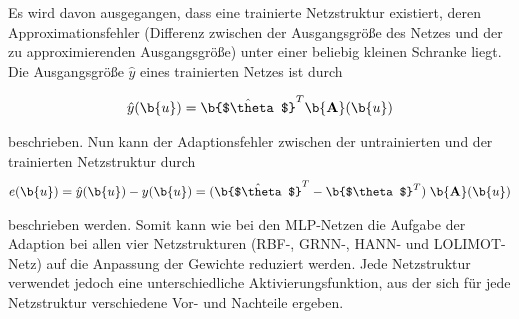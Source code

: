 Es wird davon ausgegangen, dass eine trainierte Netzstruktur existiert, deren Approximationsfehler (Differenz zwischen der Ausgangsgröße des Netzes und der zu approximierenden Ausgangsgröße) unter einer beliebig kleinen Schranke liegt. Die Ausgangsgröße $\hat{y}$ eines trainierten Netzes ist durch 


\begin{equation}
\begin{aligned}
\hat{y}(\b{u}) = \hat{\b{$\theta$}}^T \b{\textbf{A}}(\b{u})
\end{aligned}
\end{equation}

beschrieben. Nun kann der Adaptionsfehler zwischen der untrainierten und der trainierten Netzstruktur durch 
\begin{equation}
\begin{aligned}
e(\b{u}) = \hat{y}(\b{u}) - y(\b{u}) = (\hat{\b{$\theta$}}^T -  \b{$\theta$}^T) \; \b{\textbf{A}}(\b{u})
\end{aligned}
\end{equation}

beschrieben werden. Somit kann wie bei den MLP-Netzen die Aufgabe der Adaption bei allen vier Netzstrukturen (RBF-, GRNN-, HANN- und LOLIMOT-Netz) auf die Anpassung der Gewichte reduziert werden. Jede Netzstruktur verwendet jedoch eine unterschiedliche Aktivierungsfunktion, aus der sich für jede Netzstruktur verschiedene Vor- und Nachteile ergeben. \\

